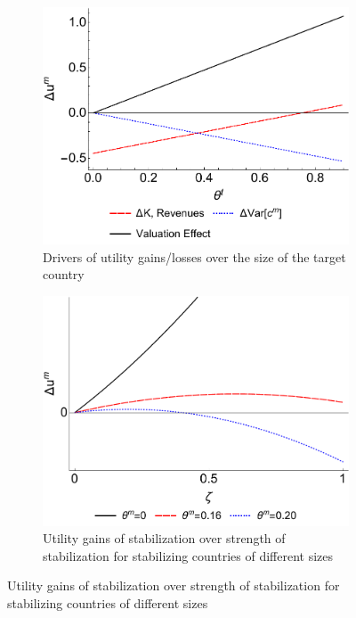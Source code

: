 \clearpage

\begin{figure}[!ht]
  \begin{minipage}{\linewidth}
    \begin{centering}
      \caption{Effect of Stabilization on Utility in the Stabilizing
        Country}\label{fig_welfare}
      \begin{subfigure}{.6\textwidth}
        \caption{Drivers of utility gains/losses over the size of the
          target country}
        \includegraphics[width=\textwidth]{./Figures/Figure_Welfare_TgtSize.pdf}
      \end{subfigure}

      \bigskip


      \begin{subfigure}{.6\textwidth}
        \caption{{Utility gains of stabilization over strength of
            stabilization for stabilizing countries of different
            sizes}}
        \includegraphics[width=\textwidth]{./Figures/Figure_Welfare_ThreeSizes.pdf}
      \end{subfigure}


\end{centering}
\end{minipage}
\end{figure}
